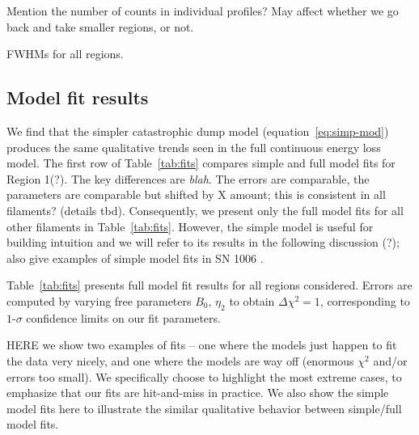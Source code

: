 \documentclass[iop, apj, numberedappendix, twocolappendix]{emulateapj}
\begin{document}
Mention the number of counts in individual profiles?
May affect whether we go back and take smaller regions, or not.

\begin{table*}[ht]
    \tiny
    \centering
    \caption{FWHMs for all regions.\label{tab:fwhms}}
    
\end{table*}


\subsection{Model fit results}
\label{sec:fit-results}

We find that the simpler catastrophic dump model (equation~\eqref{eq:simp-mod})
produces the same qualitative trends seen in the full continuous energy loss
model.
The first row of Table~\ref{tab:fits} compares simple and full model fits for
Region 1(?).
The key differences are \emph{blah}.  The errors are comparable, the parameters
are comparable but shifted by X amount; this is consistent in all filaments?
(details tbd).  Consequently, we present only the full model fits for all other
filaments in Table~\ref{tab:fits}.  However, the simple model is useful for
building intuition and we will refer to its results in the following discussion
(?);  also give examples of simple model fits in SN
1006 .

Table~\ref{tab:fits} presents full model fit results for all regions
considered. Errors are computed by varying free parameters $B_0$,
$\eta_2$ to obtain $\Delta\chi^2 = 1$, corresponding to $1$-$\sigma$ confidence
limits on our fit parameters.

HERE we show two examples of fits -- one where the models just happen to fit
the data very nicely, and one where the models are way off (enormous $\chi^2$
and/or errors too small).  We specifically choose to highlight the most extreme
cases, to emphasize that our fits are hit-and-miss in practice.
We also show the simple model fits here to illustrate the similar qualitative
behavior between simple/full model fits.
\end{document}
